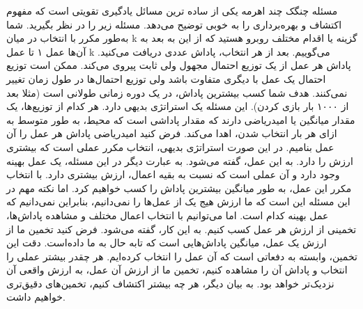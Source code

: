 مسئله چنگک چند اهرمه یکی از ساده ترین مسائل یادگیری تقویتی است که مفهوم اکتشاف و بهره‌برداری را به خوبی توضیح می‌دهد. مسئله زیر را در نظر بگیرید. شما به‌طور مکرر با انتخاب در میان k گزینه یا اقدام مختلف روبرو هستید که از این به بعد به آن‌ها عمل ۱ تا عمل k می‌گوییم. بعد از هر انتخاب، پاداش عددی دریافت می‌کنید. پاداش هر عمل از یک توزیع احتمال مجهول ولی ثابت پیروی می‌کند. ممکن است توزیع احتمال یک عمل با دیگری متفاوت باشد ولی توزیع احتمال‌ها در طول زمان تغییر نمی‌کنند. هدف شما کسب بیشترین پاداش، در یک دوره زمانی طولانی است (مثلا بعد از ۱۰۰۰ بار بازی کردن). 
 این مسئله یک استراتژی بدیهی دارد. هر کدام از توزیع‌ها، یک مقدار میانگین یا امیدریاضی دارند که مقدار پاداشی است که محیط، به طور متوسط به ازای هر بار انتخاب شدن، اهدا می‌کند. فرض کنید امیدریاضی پاداش هر عمل را  آن عمل بنامیم. در این صورت استراتژی بدیهی، انتخاب مکرر عملی است که بیشتری ارزش را دارد. به این عمل،  
 گفته می‌شود. به عبارت دیگر در این مسئله، یک عمل بهینه وجود دارد و آن عملی است که نسبت به بقیه اعمال، ارزش بیشتری دارد. با انتخاب مکرر این عمل، به طور میانگین بیشترین پاداش را کسب خواهیم کرد. اما نکته مهم در این مسئله این است که ما ارزش هیج یک از عمل‌ها را نمی‌دانیم، بنابراین نمی‌دانیم که عمل بهینه کدام است. اما می‌توانیم با انتخاب اعمال مختلف و مشاهده پاداش‌ها، تخمینی از ارزش هر عمل کسب کنیم. به این کار،  گفته می‌شود. فرض کنید تخمین ما از ارزش یک عمل، میانگین پاداش‌هایی است که تابه حال به ما داده‌است. دقت این تخمین، وابسته به دفعاتی است که آن عمل را انتخاب کرده‌ایم. هر چقدر بیشتر عملی را انتخاب و پاداش آن را مشاهده کنیم، تخمین ما از ارزش آن عمل، به ارزش واقعی آن نزدیک‌تر خواهد بود. به بیان دیگر، هر چه بیشتر اکتشاف کنیم، تخمین‌های دقیق‌تری خواهیم داشت.
%


